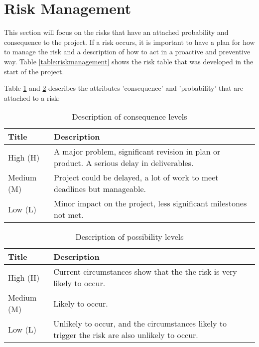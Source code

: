 
\pagestyle{fancy}
\clearpage
\section{Risk Management}

This section will focus on the risks that have an attached probability and consequence to the project. If a risk occurs, it is important to have a plan for how to manage the risk and a description of how to act in a proactive and preventive way. Table \ref{table:riskmanagement} shows the risk table that was developed in the start of the project.

Table \ref{table:consequencelevels} and \ref{table:possibilitylevels} describes the attributes 'consequence' 
and 'probability' that are attached to a risk:


\begin{table}[H]
\begin{tabular}{| p{3cm} | p{8cm} |}
  \hline
  \rowcolor{gray}
  {\bf Title} & {\bf Description} \\ \hline
    High (H) & A major problem, significant revision in plan or product. 
    A serious delay in deliverables.\\ \hline
    Medium (M) & Project could be delayed, a lot of work to meet deadlines but
    manageable.\\ \hline
    Low (L) & Minor impact on the project, less significant milestones not met.\\ \hline
\end{tabular}
\caption{Description of consequence levels}
\label{table:consequencelevels}
\end{table}

\begin{table}[H]
\begin{tabular}{| p{3cm} | p{8cm} |}
  \hline
  \rowcolor{gray}
    {\bf Title} & {\bf Description} \\ \hline
    High (H) & Current circumstances show that the the risk is very 
    likely to occur.\\ \hline
    Medium (M) & Likely to occur.\\ \hline
    Low (L) & Unlikely to occur, and the circumstances likely to trigger 
    the risk are also unlikely to occur.\\ \hline
\end{tabular}
\caption{Description of possibility levels}
\label{table:possibilitylevels}
\end{table}

